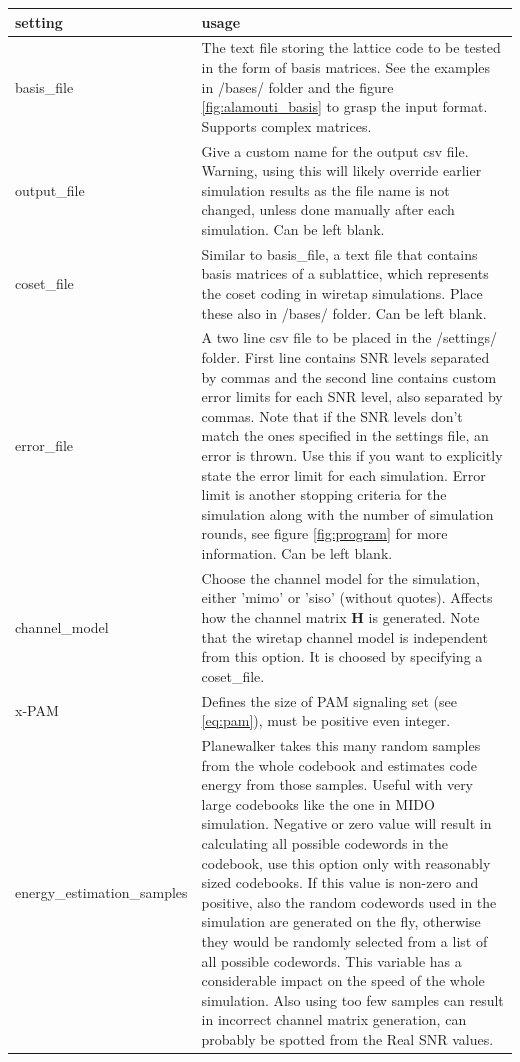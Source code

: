 \documentclass[english,12pt,a4paper,pdftex,sci,utf8]{aaltothesis}
\begin{document}
\begin{center}
  \begin{tabular}{ | l | p{9cm} | }
    \hline
    setting & usage  \\ \hline
    basis\_file & The text file storing the lattice code to be tested in the form of basis matrices. See the examples in /bases/ folder and the figure \ref{fig:alamouti_basis} to grasp the input format. Supports complex matrices. \\ \hline
    output\_file & Give a custom name for the output csv file. Warning, using this will likely override earlier simulation results as the file name is not changed, unless done manually after each simulation. Can be left blank.\\ \hline
    coset\_file & Similar to basis\_file, a text file that contains basis matrices of a sublattice, which represents the coset coding in wiretap simulations. Place these also in /bases/ folder. Can be left blank.\\ \hline
    error\_file & A two line csv file to be placed in the /settings/ folder. First line contains SNR levels separated by commas and the second line contains custom error limits for each SNR level, also separated by commas. Note that if the SNR levels don't match the ones specified in the settings file, an error is thrown. Use this if you want to explicitly state the error limit for each simulation. Error limit is another stopping criteria for the simulation along with the number of simulation rounds, see figure \ref{fig:program} for more information. Can be left blank.\\ \hline
    channel\_model & Choose the channel model for the simulation, either 'mimo' or 'siso' (without quotes). Affects how the channel matrix $\mathbf{H}$ is generated. Note that the wiretap channel model is independent from this option. It is choosed by specifying a coset\_file. \\ \hline
    x-PAM & Defines the size of PAM signaling set (see \eqref{eq:pam}), must be positive even integer. \\ \hline
    energy\_estimation\_samples & Planewalker takes this many random samples from the whole codebook and estimates code energy from those samples. Useful with very large codebooks like the one in MIDO simulation. Negative or zero value will result in calculating all possible codewords in the codebook, use this option only with reasonably sized codebooks. If this value is non-zero and positive, also the random codewords used in the simulation are generated on the fly, otherwise they would be randomly selected from a list of all possible codewords. This variable has a considerable impact on the speed of the whole simulation. Also using too few samples can result in incorrect channel matrix generation, can probably be spotted from the Real SNR values. \\
    
    \hline
  \end{tabular}
\end{center}
\end{document}
